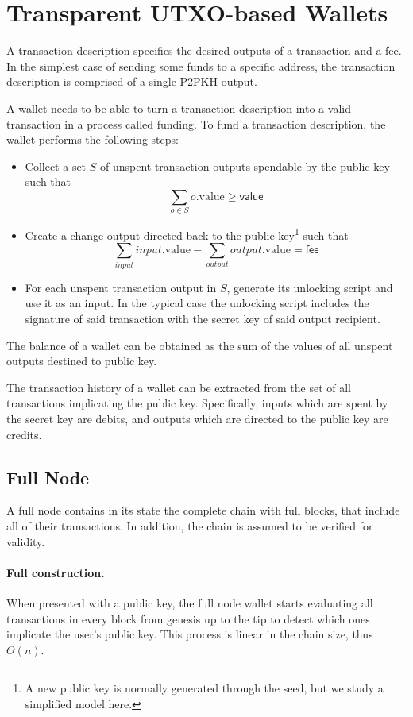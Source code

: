 \section{Transparent UTXO-based Wallets}
\label{transparent-utxo}

A transaction description specifies the desired outputs of a transaction and a fee. In the simplest case of sending some funds to a specific address, the transaction description is comprised of a single P2PKH output.

A wallet needs to be able to turn a transaction description into a valid transaction in a process called funding. To fund a transaction description, the wallet performs the following steps:

\begin{itemize}
    \item Collect a set $S$ of unspent transaction outputs spendable by the public key such that $$\sum_{o \in S} o.\text{value} \ge \textsf{value}$$
    \item Create a change output directed back to the public key\footnote{A new public key is normally generated through the seed, but we study a simplified model here.} such that
    $$\sum_{input} input.\text{value} - \sum_{output} output.\text{value} = \textsf{fee}$$
    \item For each unspent transaction output in $S$, generate its unlocking script and use it as an input. In the typical case the unlocking script includes the signature of said transaction with the secret key of said output recipient.
\end{itemize}

The balance of a wallet can be obtained as the sum of the values of all unspent outputs destined to public key.

The transaction history of a wallet can be extracted from the set of all transactions implicating the public key. Specifically, inputs which are spent by the secret key are debits, and outputs which are directed to the public key are credits.

\subsection{Full Node}
A full node contains in its state the complete chain with full blocks, that include all of their transactions. In addition, the chain is assumed to be verified for validity.

\paragraph{Full construction.}
When presented with a public key, the full node wallet starts evaluating all transactions in every block from genesis up to the tip to detect which ones implicate the user's public key. This process is linear in the chain size, thus $\Theta(n)$.


